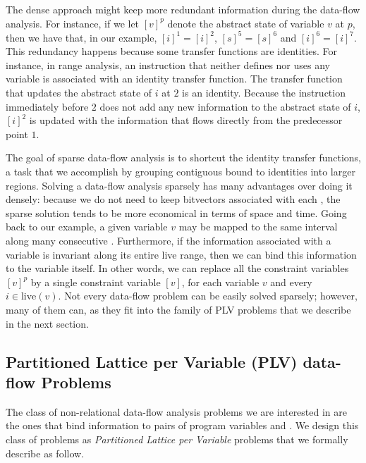 The dense approach might keep more redundant information during the
data-flow analysis.
For instance, if we let $[v]^p$ denote the abstract state of variable
$v$ at \progpoint $p$, then we have that, in our example, $[i]^1 = [i]^2$,
$[s]^5 = [s]^6$ and $[i]^6 = [i]^7$.
This redundancy happens because some transfer functions are identities.
For instance, in range analysis, an instruction that neither defines nor uses any variable is associated with an identity transfer function.
The transfer function that updates the abstract state of $i$ at \progpoint $2$ is an identity.
Because the instruction immediately before $2$ does not add any new information to the abstract state of $i$, $[i]^2$ is updated with the information that flows directly from the predecessor point $1$.

The goal of sparse data-flow analysis is to shortcut the identity transfer functions, a task that we accomplish by grouping contiguous \progpoints bound to identities into larger regions.
Solving a data-flow analysis sparsely has many advantages over doing it densely: because we do not need to keep bitvectors associated with each \progpoint, the sparse solution tends to be more economical in terms of space and time.
Going back to our example, a given variable $v$ may be mapped to the same interval along many consecutive \progpoints.
Furthermore, if the information associated with a variable is invariant along its
entire live range, then we can bind this information to the variable itself.
In other words, we can replace all the constraint variables
$[v]^p$ by a single constraint variable $[v]$, for each variable $v$
and every $i\in \textrm{live}(v)$.
Not every data-flow problem can be easily solved sparsely; however, many of them can, as they fit into the family of PLV problems that we describe in the next section.

\subsection{Partitioned Lattice per Variable (PLV) data-flow Problems}
\label{sec:ssi:pereira:pvpPvl}

The class of non-relational data-flow analysis problems we are interested in are the ones that bind information to pairs of program variables and \progpoints.
We design this class of problems as \emph{Partitioned Lattice per Variable} problems that we formally describe as follow.


